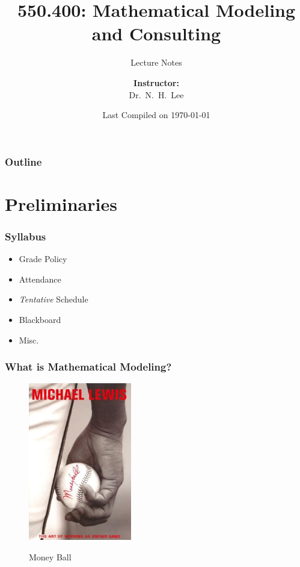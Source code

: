 \documentclass[hyperref={colorlinks=false},compress,handout,10pt]{beamer}
\title{{\color{blue} \LARGE 550.400: Mathematical Modeling and Consulting\newline} }
\subtitle{{\color{red} \large Lecture Notes} }
\author{ 
    {\bf{Instructor:}} \\ 
Dr.~N.~H.~Lee \\ 
    \vspace{5pt}
}
\institute{JHU AMS 2012 FALL}
\date{\mygreen Last Compiled on \today}
\let\olditem\item
\renewcommand{\item}{\setlength{\itemsep}{0.5\baselineskip}\olditem}
\begin{document}
\begin{frame}[plain]
  \titlepage
\end{frame}

\begin{frame}
  \frametitle{Outline}
  \tableofcontents
\end{frame}

\section{Preliminaries}

\begin{frame}
    \frametitle{Syllabus}
    \begin{itemize}
        \item Grade Policy
        \item Attendance
        \item \emph{Tentative} Schedule
        \item Blackboard
        \item Misc.
    \end{itemize}
\end{frame}


\begin{frame}
    \frametitle{What is Mathematical Modeling?}
    \begin{figure}
            \centering
            \href{http://www.youtube.com/watch?v=WNlCBy07z08}{
            \includegraphics[width=0.4\textwidth]{Moneyballs.jpg}
            }
            \caption{Money Ball}
            \label{fig:MondayBall}
    \end{figure}
\end{frame}
\end{document}
